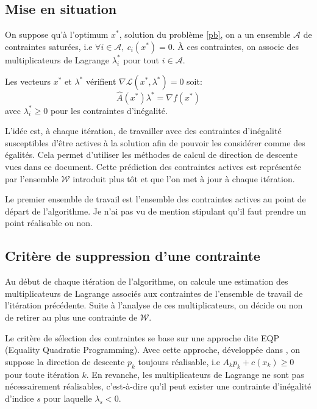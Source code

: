 \documentclass[a4paper,11pt]{article}
\newcommand{\ha}{\hat{A}}
\numberwithin{equation}{section}
\begin{document}
\subsection{Mise en situation}

On suppose qu'à l'optimum $x^{*}$, solution du problème \eqref{pb}, on a 
un ensemble $\mathcal{A}$ de contraintes saturées, i.e $\forall i \in \mathcal{A},\ c_{i}(x^{*}) = 0$.
À ces contraintes, on associe des multiplicateurs de Lagrange $\lambda^{*}_{i}$ pour tout $i\in \mathcal{A}$. 

Les vecteurs $x^{*}$ et $\lambda^{*}$ vérifient $\nabla \mathcal{L}(x^{*},\lambda^{*}) = 0$ soit:
\begin{equation} 
\ha(x^{*})\lambda^{*}=\nabla f(x^{*})
\end{equation}
avec $\lambda_{i}^{*}\geq0$ pour les contraintes d'inégalité. 

L'idée est, à chaque itération, de travailler avec des contraintes d'inégalité susceptibles d'être actives à la solution afin de pouvoir les considérer comme des égalités. Cela permet d'utiliser les méthodes de calcul de direction de descente vues dans ce document. Cette prédiction des contraintes actives est représentée par l'ensemble $\mathcal{W}$ introduit plus tôt et que l'on met à jour à chaque itération. 

Le premier ensemble de travail est l'ensemble des contraintes actives au point de départ de l'algorithme. Je n'ai pas vu de mention stipulant qu'il faut prendre un point réalisable ou non.
\subsection{Critère de suppression d'une contrainte} \label{criteresupr}

Au début de chaque itération de l'algorithme, on calcule une estimation des multiplicateurs de Lagrange associés aux contraintes de l'ensemble de travail de l'itération précédente. Suite à l'analyse de ces multiplicateurs, on décide ou non de retirer au plus une contrainte de $\mathcal{W}$.

Le critère de sélection des contraintes se base sur une approche dite EQP (Equality Quadratic Programming). Avec cette approche, développée dans \cite{gillmurray1985}, on suppose la direction de descente $p_{k}$ toujours réalisable, i.e $A_{k}p_{k} + c(x_{k}) \geq 0$ pour toute itération $k$. En revanche, les multiplicateurs de Lagrange ne sont pas nécessairement réalisables, c'est-à-dire qu'il peut exister une contrainte d'inégalité d'indice $s$ pour laquelle $\lambda_{s}<0$.  
\end{document}
